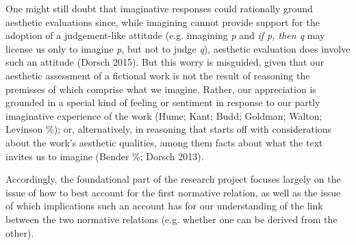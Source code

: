 One might still doubt that imaginative responses could rationally ground
aesthetic evaluations since, while imagining cannot provide support for
the adoption of a judgement-like attitude (e.g. imagining \emph{p} and \emph{if p,
then q} may license us only to imagine \emph{p}, but not to judge \emph{q}), aesthetic
evaluation does involve such an attitude (Dorsch 2015). But this worry
is misguided, given that our aesthetic assessment of a fictional work is
not the result of reasoning the premisses of which comprise what we
imagine. Rather, our appreciation is grounded in a special kind of
feeling or sentiment in response to our partly imaginative experience of
the work (Hume; Kant; Budd; Goldman; Walton; Levinson \%); or,
alternatively, in reasoning that starts off with considerations about
the work's aesthetic qualities, among them facts about what the text
invites us to imagine (Bender \%; Dorsch 2013).

Accordingly, the foundational part of the research project focuses
largely on the issue of how to best account for the first normative
relation, as well as the issue of which implications such an account has
for our understanding of the link between the two normative relations
(e.g. whether one can be derived from the other).

